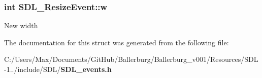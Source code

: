 \subsubsection[{w}]{\setlength{\rightskip}{0pt plus 5cm}int S\+D\+L\+\_\+\+Resize\+Event\+::w}\label{struct_s_d_l___resize_event_acd9eca9322c2d247bb0329e2ea97fc0f}
New width 

The documentation for this struct was generated from the following file\+:\begin{DoxyCompactItemize}
\item 
C\+:/\+Users/\+Max/\+Documents/\+Git\+Hub/\+Ballerburg/\+Ballerburg\+\_\+v001/\+Resources/\+S\+D\+L-\/1../include/\+S\+D\+L/{\bf S\+D\+L\+\_\+events.\+h}\end{DoxyCompactItemize}
